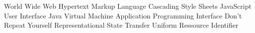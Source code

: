 \begin{acronym}[HTML]
			{World Wide Web}
			{Hypertext Markup Language}
			{Cascading Style Sheets}
			{JavaScript}
			{User Interface}
			{Java Virtual Machine}
   			{Application Programming Interface}
	 {Don't Repeat Yourself}
	 {Representational State Transfer}
	 {Uniform Ressource Identifier}
\end{acronym}
